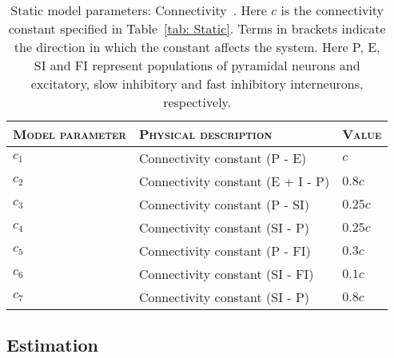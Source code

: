 \begin{center}%
	\begin{table}
			\caption[Static Model Parameters: Connectivity]{Static model parameters: Connectivity~\citep{wendling2002epileptic}. Here $c$ is the connectivity constant specified in Table~\ref{tab: Static}. Terms in brackets indicate the direction in which the constant affects the system. Here P, E, SI and FI represent populations of pyramidal neurons and excitatory, slow inhibitory and fast inhibitory interneurons, respectively.}
		\begin{tabular}{||p{4cm}|p{7cm}|p{2cm}||}\hline
			 \textsc{Model parameter}  & \textsc{Physical description} & \textsc{Value}
			   \\\hline\hline
			 $c_{1}$ & Connectivity constant (P - E) & $c$ \\\hline
			 $c_{2}$ & Connectivity constant (E + I - P) & $0.8c$ \\\hline
			 $c_{3}$ & Connectivity constant (P - SI) & $0.25c$  \\\hline
			 $c_{4}$ & Connectivity constant (SI - P)& $0.25c$ \\\hline
			 $c_{5}$ & Connectivity constant (P - FI) & $0.3c$ \\\hline
			 $c_{6}$ & Connectivity constant (SI - FI) & $0.1c$ \\\hline
			 $c_{7}$ & Connectivity constant (SI - P) & $0.8c$ \\\hline\hline
		\end{tabular}
		\label{tab: Connectivity}
	\end{table}
\end{center}%
\normalsize
\onehalfspacing

\subsection{Estimation}

